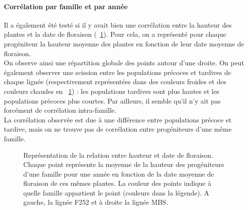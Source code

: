 \documentclass[12pt,a4paper]{article}
\begin{document}
			 				\paragraph{Corrélation par famille et par année}
			 				Il a également été testé si il y avait bien une corrélation entre la hauteur des plantes et la date de floraison (~\ref{correlation}). Pour cela, on a représenté pour chaque progéniteur la hauteur moyenne des plantes en fonction de leur date moyenne de floraison.\\
			 				On observe ainsi une répartition globale des points autour d'une droite. On peut également observer une scission entre les populations précoces et tardives de chaque lignée (respectivement représentées dans des couleurs froides et des couleurs chaudes en ~\ref{correlation}) : les populations tardives sont plus hautes et les populations précoces plus courtes. Par ailleurs, il semble qu'il n'y ait pas forcément de corrélation intra-famille.\\
			 				La corrélation observée est due à une différence entre populations précoce et tardive, mais on ne trouve pas de corrélation entre progéniteurs d'une même famille.
			 				
			 				\begin{figure} %
			 					\centering
			 					\caption{Représentation de la relation entre hauteur et date de floraison.\\
			 					Chaque point représente la moyenne de la hauteur des progéniteurs d'une famille pour une année en fonction de la date moyenne de floraison de ces mêmes plantes. La couleur des points indique à quelle famille appartient le point (couleurs dans la légende). A gauche, la lignée F252 et à droite la lignée MBS.
			 					\label{correlation}}
			 				\end{figure}
	 				
\end{document}
